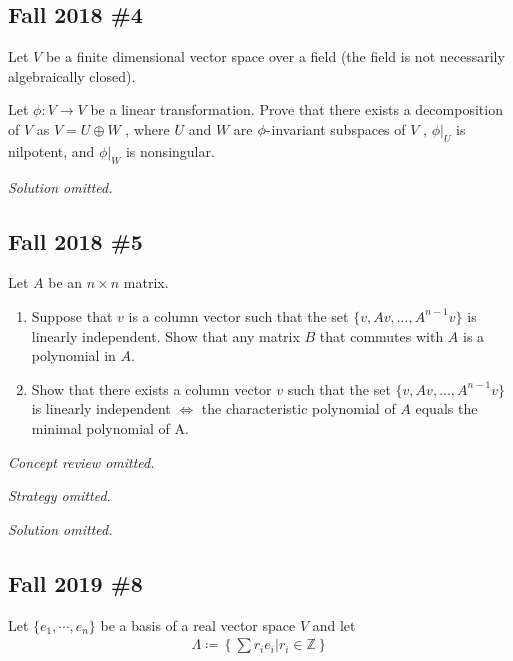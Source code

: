 \hypertarget{fall-2018-4}{%
\subsection{Fall 2018 \#4}\label{fall-2018-4}}

Let \(V\) be a finite dimensional vector space over a field (the field
is not necessarily algebraically closed).

Let \(\phi : V \to V\) be a linear transformation. Prove that there
exists a decomposition of \(V\) as \(V = U \oplus W\) , where \(U\) and
\(W\) are \(\phi{\hbox{-}}\)invariant subspaces of \(V\) ,
\({\left.{{\phi}} \right|_{{U}} }\) is nilpotent, and
\({\left.{{\phi}} \right|_{{W}} }\) is nonsingular.


\emph{Solution omitted.}

\hypertarget{fall-2018-5}{%
\subsection{Fall 2018 \#5}\label{fall-2018-5}}

Let \(A\) be an \(n \times n\) matrix.

\begin{enumerate}
\def\labelenumi{\alph{enumi}.}
\item
  Suppose that \(v\) is a column vector such that the set
  \(\{v, Av, . . . , A^{n-1} v\}\) is linearly independent. Show that
  any matrix \(B\) that commutes with \(A\) is a polynomial in \(A\).
\item
  Show that there exists a column vector \(v\) such that the set
  \(\{v, Av, . . . , A^{n-1} v\}\) is linearly independent \(\iff\) the
  characteristic polynomial of \(A\) equals the minimal polynomial of A.
\end{enumerate}

\emph{Concept review omitted.}

\emph{Strategy omitted.}

\emph{Solution omitted.}

\hypertarget{fall-2019-8}{%
\subsection{Fall 2019 \#8}\label{fall-2019-8}}

Let \(\{e_1, \cdots, e_n \}\) be a basis of a real vector space \(V\)
and let
\begin{align*}
\Lambda \coloneqq\left\{{ \sum r_i e_i \mathrel{\Big|}r_i \in {\mathbb{Z}}}\right\}
\end{align*}

